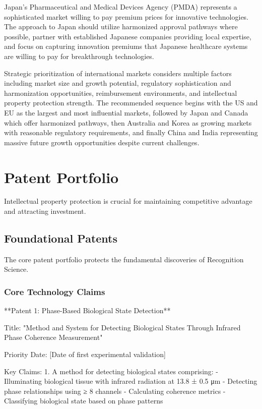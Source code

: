 \documentclass[12pt,a4paper]{report}
\begin{document}
Japan's Pharmaceutical and Medical Devices Agency (PMDA) represents a sophisticated market willing to pay premium prices for innovative technologies. The approach to Japan should utilize harmonized approval pathways where possible, partner with established Japanese companies providing local expertise, and focus on capturing innovation premiums that Japanese healthcare systems are willing to pay for breakthrough technologies.

Strategic prioritization of international markets considers multiple factors including market size and growth potential, regulatory sophistication and harmonization opportunities, reimbursement environments, and intellectual property protection strength. The recommended sequence begins with the US and EU as the largest and most influential markets, followed by Japan and Canada which offer harmonized pathways, then Australia and Korea as growing markets with reasonable regulatory requirements, and finally China and India representing massive future growth opportunities despite current challenges.

\chapter{Patent Portfolio}

Intellectual property protection is crucial for maintaining competitive advantage and attracting investment.

\section{Foundational Patents}

The core patent portfolio protects the fundamental discoveries of Recognition Science.

\subsection{Core Technology Claims}

**Patent 1: Phase-Based Biological State Detection**

Title: "Method and System for Detecting Biological States Through Infrared Phase Coherence Measurement"

Priority Date: [Date of first experimental validation]

Key Claims:
1. A method for detecting biological states comprising:
   - Illuminating biological tissue with infrared radiation at 13.8 ± 0.5 μm
   - Detecting phase relationships using ≥ 8 channels
   - Calculating coherence metrics
   - Classifying biological state based on phase patterns
\end{document}
